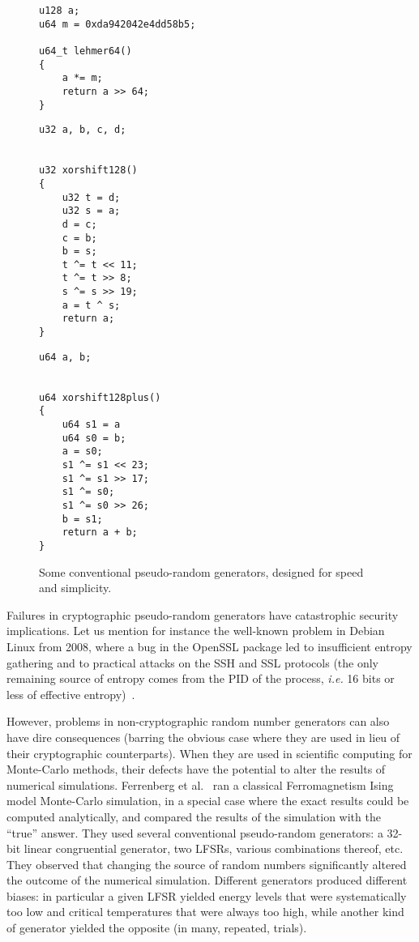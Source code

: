 \documentclass[journal=tosc,final]{iacrtrans}
\begin{document}
\begin{figure}
  \begin{minipage}[t]{5cm}
\begin{verbatim}
u128 a;
u64 m = 0xda942042e4dd58b5;

u64_t lehmer64() 
{
    a *= m;
    return a >> 64;
}
\end{verbatim}
  \end{minipage}
    \begin{minipage}[t]{4cm}
\begin{verbatim}
u32 a, b, c, d;


u32 xorshift128()
{
    u32 t = d;
    u32 s = a;
    d = c;
    c = b;
    b = s;
    t ^= t << 11;
    t ^= t >> 8;
    s ^= s >> 19;
    a = t ^ s;
    return a;
}
\end{verbatim}
    \end{minipage}
    \begin{minipage}[t]{4cm}
\begin{verbatim}
u64 a, b;


u64 xorshift128plus()
{
    u64 s1 = a
    u64 s0 = b;
    a = s0;
    s1 ^= s1 << 23;        
    s1 ^= s1 >> 17;        
    s1 ^= s0;        
    s1 ^= s0 >> 26;
    b = s1;
    return a + b;
}
\end{verbatim}
    \end{minipage}
    \caption{Some conventional pseudo-random generators, designed for speed and simplicity.}
    \label{fig:prngs}
  \end{figure}
  
Failures in cryptographic pseudo-random generators have catastrophic security
implications. Let us mention for instance the well-known problem in Debian
Linux from 2008, where a bug in the OpenSSL package led to insufficient
entropy gathering and to practical attacks on the SSH and SSL protocols (the
only remaining source of entropy comes from the PID of the process,
\textit{i.e.} 16 bits or less of effective entropy)~\cite{YilekRSES09}.

However, problems in non-cryptographic random number generators can also have
dire consequences (barring the obvious case where they are used in lieu of their
cryptographic counterparts). When they are used in scientific computing for
Monte-Carlo methods, their defects have the potential to alter the results of
numerical simulations. Ferrenberg et al.~\cite{Ferrenberg92} ran a classical
Ferromagnetism Ising model Monte-Carlo simulation, in a special case where the
exact results could be computed analytically, and compared the results of the
simulation with the ``true'' answer. They used several conventional
pseudo-random generators: a 32-bit linear congruential generator, two LFSRs,
various combinations thereof, etc. They observed that changing the source of
random numbers significantly altered the outcome of the numerical
simulation. Different generators produced different biases: in particular a
given LFSR yielded energy levels that were systematically too low and critical
temperatures that were always too high, while another kind of generator yielded
the opposite (in many, repeated, trials).
\end{document}
